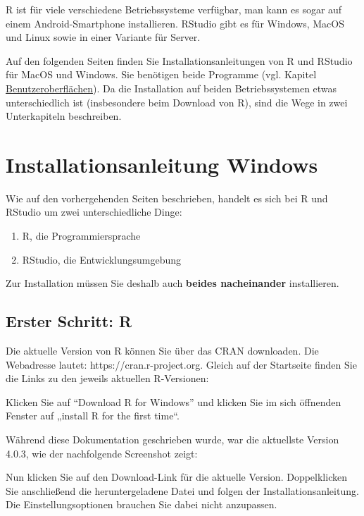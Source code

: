 \documentclass[
]{book}
\begin{document}
R ist für viele verschiedene Betriebssysteme verfügbar, man kann es sogar auf einem Android-Smartphone installieren. RStudio gibt es für Windows, MacOS und Linux sowie in einer Variante für Server.

Auf den folgenden Seiten finden Sie Installationsanleitungen von R und RStudio für MacOS und Windows. Sie benötigen beide Programme (vgl. Kapitel \protect\hyperlink{benutzeroberfluxe4chen}{Benutzeroberflächen}).
Da die Installation auf beiden Betriebssystemen etwas unterschiedlich ist (insbesondere beim Download von R), sind die Wege in zwei Unterkapiteln beschreiben.

\hypertarget{installationsanleitung-windows}{%
\section{Installationsanleitung Windows}\label{installationsanleitung-windows}}

Wie auf den vorhergehenden Seiten beschrieben, handelt es sich bei R und RStudio um zwei unterschiedliche Dinge:

\begin{enumerate}
\def\labelenumi{\arabic{enumi}.}
\item
  R, die Programmiersprache
\item
  RStudio, die Entwicklungsumgebung
\end{enumerate}

Zur Installation müssen Sie deshalb auch \textbf{beides nacheinander} installieren.

\hypertarget{erster-schritt-r}{%
\subsection{Erster Schritt: R}\label{erster-schritt-r}}

Die aktuelle Version von R können Sie über das CRAN downloaden. Die Webadresse lautet: https://cran.r-project.org. Gleich auf der Startseite finden Sie die Links zu den jeweils aktuellen R-Versionen:

Klicken Sie auf ``Download R for Windows'' und klicken Sie im sich öffnenden Fenster auf „install R for the first time``.

Während diese Dokumentation geschrieben wurde, war die aktuellste Version 4.0.3, wie der nachfolgende Screenshot zeigt:

Nun klicken Sie auf den Download-Link für die aktuelle Version. Doppelklicken Sie anschließend die heruntergeladene Datei und folgen der Installationsanleitung. Die Einstellungsoptionen brauchen Sie dabei nicht anzupassen.
\end{document}
